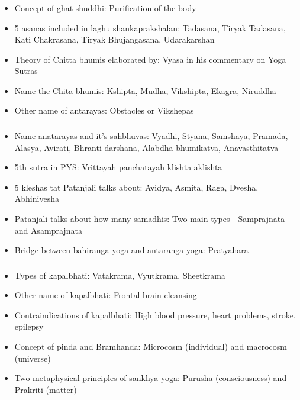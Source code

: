 \begin{frame}[fragile]\frametitle{}
\begin{itemize}
\item Concept of ghat shuddhi: Purification of the body
\item 5 asanas included in laghu shankaprakshalan: Tadasana, Tiryak Tadasana, Kati Chakrasana, Tiryak Bhujangasana, Udarakarshan
\item Theory of Chitta bhumis elaborated by: Vyasa in his commentary on Yoga Sutras
\item Name the Chita bhumis: Kshipta, Mudha, Vikshipta, Ekagra, Niruddha
\item Other name of antarayas: Obstacles or Vikshepas
\end{itemize}
\end{frame}

\begin{frame}[fragile]\frametitle{}
\begin{itemize}
\item Name anatarayas and it's sahbhuvas: Vyadhi, Styana, Samshaya, Pramada, Alasya, Avirati, Bhranti-darshana, Alabdha-bhumikatva, Anavasthitatva
\item 5th sutra in PYS: Vrittayah panchatayah klishta aklishta
\item 5 kleshas tat Patanjali talks about: Avidya, Asmita, Raga, Dvesha, Abhinivesha
\item Patanjali talks about how many samadhis: Two main types - Samprajnata and Asamprajnata
\item Bridge between bahiranga yoga and antaranga yoga: Pratyahara
\end{itemize}
\end{frame}

\begin{frame}[fragile]\frametitle{}
\begin{itemize}
\item Types of kapalbhati: Vatakrama, Vyutkrama, Sheetkrama
\item Other name of kapalbhati: Frontal brain cleansing
\item Contraindications of kapalbhati: High blood pressure, heart problems, stroke, epilepsy
\item Concept of pinda and Bramhanda: Microcosm (individual) and macrocosm (universe)
\item Two metaphysical principles of sankhya yoga: Purusha (consciousness) and Prakriti (matter)
\end{itemize}
\end{frame}

